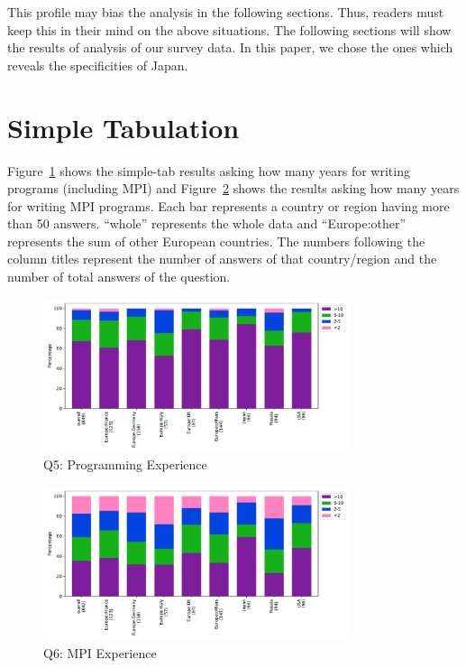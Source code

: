 \documentclass[submit,techrep,noauthor,english]{ipsj}
\begin{document}
This profile may bias the analysis in the 
following sections. Thus, readers must keep this in their mind on the
above situations.
The following sections will show the results of analysis of our survey
data. In this paper, we chose the ones which reveals the specificities
of Japan. 

\section{Simple Tabulation}\label{sec:simple-tab}

Figure~\ref{fig:q5} shows the simple-tab results asking how many years
for writing programs (including MPI) and Figure~\ref{fig:q6} shows the
results asking how many years for writing MPI programs. Each bar
represents a country or region having more than 50 answers. ``whole''
represents the whole data and ``Europe:other'' represents the sum of
other European countries. The numbers
following the column titles represent the number of answers of that
country/region and the number of total answers of the question.

\begin{figure}[htb]
\begin{center}
  \includegraphics[width=9cm]{../pdfs/Q5.pdf}
  \vspace{-8mm}
\caption{Q5: Programming Experience}
\label{fig:q5}
\end{center}
\end{figure}

\begin{figure}[htb]
\begin{center}
\includegraphics[width=9cm]{../pdfs/Q6.pdf}
  \vspace{-8mm}
\caption{Q6: MPI Experience}
\label{fig:q6}
\end{center}
\end{figure}
\end{document}
